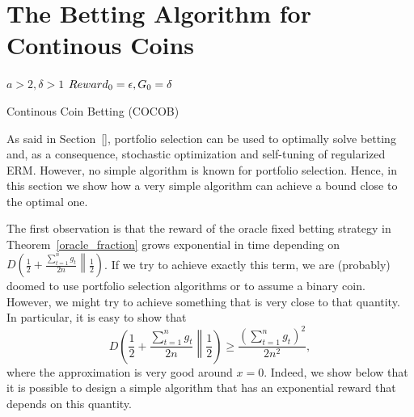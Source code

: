 \section{The Betting Algorithm for Continous Coins}
\label{sec:algo}

\begin{algorithm}[t]
  \begin{algorithmic}
  {
     $a>2,\delta>1$
     $Reward_0=\epsilon,G_0=\delta$
    \ENDFOR
  }
  \end{algorithmic}
  \caption{Continous Coin Betting (COCOB)}
  \label{alg:cocob}
\end{algorithm}

As said in Section~\ref{}, portfolio selection can be used to optimally solve betting and, as a consequence, stochastic optimization and self-tuning of regularized \ac{ERM}. However, no simple algorithm is known for portfolio selection.
Hence, in this section we show how a very simple algorithm can achieve a bound close to the optimal one.

The first observation is that the reward of the oracle fixed betting strategy in Theorem~\ref{oracle_fraction} grows exponential in time depending on $D\left(\frac{1}{2}+\frac{\sum_{t=1}^n g_t}{2 n}\middle\|\frac{1}{2}\right)$. If we try to achieve exactly this term, we are (probably) doomed to use portfolio selection algorithms or to assume a binary coin.
However, we might try to achieve something that is very close to that quantity.
In particular, it is easy to show that
\[
D\left(\frac{1}{2}+\frac{\sum_{t=1}^n g_t}{2 n}\middle\|\frac{1}{2}\right) \geq \frac{(\sum_{t=1}^n g_t)^2}{2 n^2},
\]
where the approximation is very good around $x=0$. Indeed, we show below that it is possible to design a simple algorithm that has an exponential reward that depends on this quantity.

